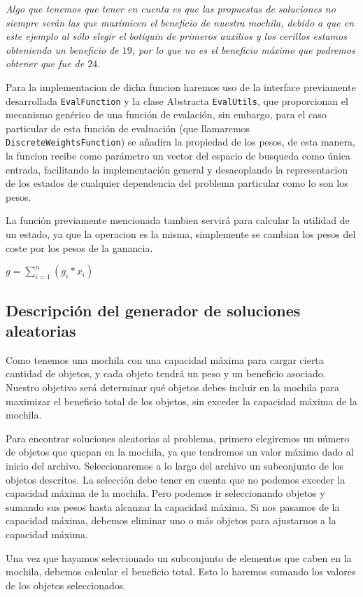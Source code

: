 \documentclass{article}
\begin{document}
\textit{Algo que tenemos que tener en cuenta es que las propuestas de soluciones no siempre serán las que maximicen el beneficio de nuestra mochila, debido a que en este ejemplo al sólo elegir el botiquin de primeros auxilios y los cerillos estamos obteniendo un beneficio de $19$, por lo que no es el beneficio máximo que podremos obtener que fue de $24$}.

Para la implementacion de dicha funcion haremos uso de la interface previamente desarrollada \texttt{EvalFunction} y la clase Abstracta \texttt{EvalUtils}, que proporcionan el mecanismo genérico de una función de evalación, sin embargo, para el caso particular de esta función de evaluación 
(que llamaremos \texttt{DiscreteWeightsFunction}) se añadira la propiedad de los pesos, de esta manera, la funcion recibe como parámetro un vector del espacio de busqueda como única entrada, facilitando la implementación general y desacoplando la representacion de los estados de cualquier dependencia del problema particular como lo son los pesos.

	La función previamente mencionada tambien servirá para calcular la utilidad de un estado, ya que la operacion es la misma, simplemente se cambian los pesos del coste por los pesos de la ganancia. 

		$g = \sum_{i=1}^{n}(g_i * x_i)$


\subsection*{Descripción del generador de soluciones aleatorias}
Como tenemos una mochila con una capacidad máxima para cargar cierta cantidad de objetos, y cada objeto tendrá un peso y un beneficio asociado. Nuestro objetivo será determinar qué objetos debes incluir en la mochila para maximizar el beneficio total de los objetos, sin exceder la capacidad máxima de la mochila.

Para encontrar soluciones aleatorias al problema, primero elegiremos un número de objetos que quepan en la mochila, ya que tendremos un valor máximo dado al inicio del archivo. Seleccionaremos a lo largo del archivo un subconjunto de los objetos descritos. La selección debe tener en cuenta que no podemos exceder la capacidad máxima de la mochila. Pero podemos ir seleccionando objetos y sumando sus pesos hasta alcanzar la capacidad máxima. Si nos pasamos de la capacidad máxima, debemos eliminar uno o más objetos para ajustarnos a la capacidad máxima.

Una vez que hayamos seleccionado un subconjunto de elementos que caben en la mochila, debemos calcular el beneficio total. Esto lo haremos sumando los valores de los objetos seleccionados.
\end{document}

